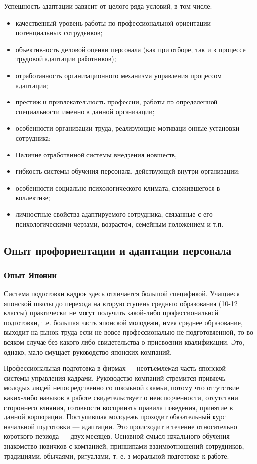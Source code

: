 \documentclass[a4paper,12pt,oneside,final]{extarticle}
\numberwithin{equation}{section}
\begin{document}
Успешность адаптации зависит от целого ряда условий, в том числе:
\begin{itemize}
	\item качественный уровень работы по профессиональной ориентации потенциальных сотрудников;
	\item объективность деловой оценки персонала (как при отборе, так и в процессе трудовой адаптации работников);
	\item отработанность организационного механизма управления процессом адаптации;
	\item престиж и привлекательность профессии, работы по определенной специальности именно в данной организации;
	\item особенности организации труда, реализующие мотиваци-онные установки сотрудника;
	\item Наличие отработанной системы внедрения новшеств;
	\item гибкость системы обучения персонала, действующей внутри организации;
	\item особенности социально-психологического климата, сложившегося в коллективе;
	\item личностные свойства адаптируемого сотрудника, связанные с его психологическими чертами, возрастом, семейным положением и т.п.
\end{itemize}

\subsection{Опыт профориентации и адаптации персонала}
\subsubsection{Опыт Японии}
Система подготовки кадров здесь отличается большой спецификой. 
Учащиеся японской школы до перехода на вторую ступень среднего образования (10-12 классы) практически не могут получить какой-либо профессиональной подготовки, т.е. большая часть японской молодежи, имея среднее образование, выходит на рынок труда если не вовсе профессионально не подготовленной, то во всяком случае без какого-либо свидетельства о присвоении квалификации. 
Это, однако, мало смущает руководство японских компаний.

Профессиональная подготовка в фирмах --- неотъемлемая часть японской системы управления кадрами. 
Руководство компаний стремится привлечь молодых людей непосредственно со школьной скамьи, потому что отсутствие каких-либо навыков в работе свидетельствует о неиспорченности, отсутствии стороннего влияния, готовности воспринять правила поведения, принятие в данной корпорации. 
Поступившая молодежь проходит обязательный курс начальной подготовки --- адаптации. 
Это происходит в течение относительно короткого периода --- двух месяцев. 
Основной смысл начального обучения --- знакомство новичков с компанией, принципами взаимоотношений сотрудников, традициями, обычаями, ритуалами, т. е. в моральной подготовке к работе.
\end{document}
